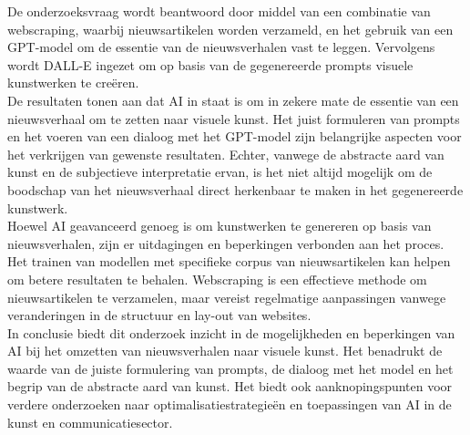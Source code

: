 De onderzoeksvraag wordt beantwoord door middel van een combinatie van webscraping, waarbij nieuwsartikelen worden verzameld, en het gebruik van een GPT-model om de essentie van de nieuwsverhalen vast te leggen. Vervolgens wordt DALL-E ingezet om op basis van de gegenereerde prompts visuele kunstwerken te creëren.\\

De resultaten tonen aan dat AI in staat is om in zekere mate de essentie van een nieuwsverhaal om te zetten naar visuele kunst. Het juist formuleren van prompts en het voeren van een dialoog met het GPT-model zijn belangrijke aspecten voor het verkrijgen van gewenste resultaten. Echter, vanwege de abstracte aard van kunst en de subjectieve interpretatie ervan, is het niet altijd mogelijk om de boodschap van het nieuwsverhaal direct herkenbaar te maken in het gegenereerde kunstwerk.\\

Hoewel AI geavanceerd genoeg is om kunstwerken te genereren op basis van nieuwsverhalen, zijn er uitdagingen en beperkingen verbonden aan het proces. Het trainen van modellen met specifieke corpus van nieuwsartikelen kan helpen om betere resultaten te behalen. Webscraping is een effectieve methode om nieuwsartikelen te verzamelen, maar vereist regelmatige aanpassingen vanwege veranderingen in de structuur en lay-out van websites.\\

In conclusie biedt dit onderzoek inzicht in de mogelijkheden en beperkingen van AI bij het omzetten van nieuwsverhalen naar visuele kunst. Het benadrukt de waarde van de juiste formulering van prompts, de dialoog met het model en het begrip van de abstracte aard van kunst. Het biedt ook aanknopingspunten voor verdere onderzoeken naar optimalisatiestrategieën en toepassingen van AI in de kunst en communicatiesector.

\pagebreak
